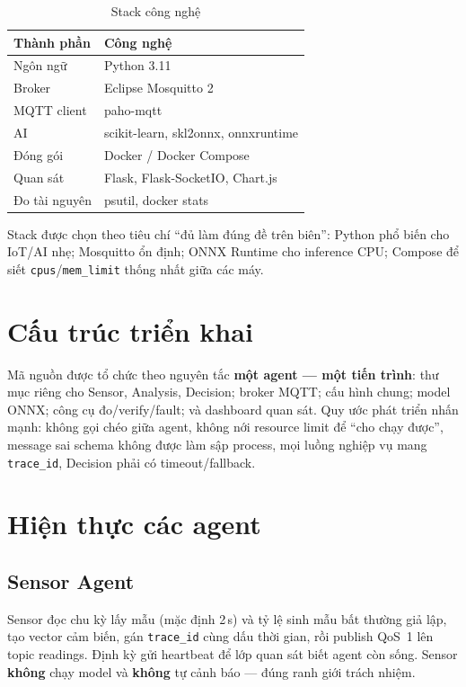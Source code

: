 \documentclass[12pt,a4paper,oneside]{report}
\newcommand{\code}[1]{\texttt{#1}}
\begin{document}
\begin{table}[htbp]
  \centering
  \caption{Stack công nghệ}
  \label{tab:stack}
  \begin{tabular}{ll}
    \toprule
    \textbf{Thành phần} & \textbf{Công nghệ} \\
    \midrule
    Ngôn ngữ & Python 3.11 \\
    Broker & Eclipse Mosquitto 2 \\
    MQTT client & paho-mqtt~\cite{paho-mqtt} \\
    AI & scikit-learn, skl2onnx, onnxruntime \\
    Đóng gói & Docker / Docker Compose~\cite{docker-compose} \\
    Quan sát & Flask, Flask-SocketIO, Chart.js \\
    Đo tài nguyên & psutil, docker stats \\
    \bottomrule
  \end{tabular}
\end{table}

Stack được chọn theo tiêu chí ``đủ làm đúng đề trên biên'': Python phổ biến cho IoT/AI nhẹ; Mosquitto ổn định; ONNX Runtime cho inference CPU; Compose để siết \code{cpus}/\code{mem\_limit} thống nhất giữa các máy.

\section{Cấu trúc triển khai}

Mã nguồn được tổ chức theo nguyên tắc \textbf{một agent --- một tiến trình}: thư mục riêng cho Sensor, Analysis, Decision; broker MQTT; cấu hình chung; model ONNX; công cụ đo/verify/fault; và dashboard quan sát. Quy ước phát triển nhấn mạnh: không gọi chéo giữa agent, không nới resource limit để ``cho chạy được'', message sai schema không được làm sập process, mọi luồng nghiệp vụ mang \code{trace\_id}, Decision phải có timeout/fallback.

\section{Hiện thực các agent}

\subsection{Sensor Agent}
Sensor đọc chu kỳ lấy mẫu (mặc định 2\,s) và tỷ lệ sinh mẫu bất thường giả lập, tạo vector cảm biến, gán \code{trace\_id} cùng dấu thời gian, rồi publish QoS~1 lên topic readings. Định kỳ gửi heartbeat để lớp quan sát biết agent còn sống. Sensor \textbf{không} chạy model và \textbf{không} tự cảnh báo --- đúng ranh giới trách nhiệm.
\end{document}
